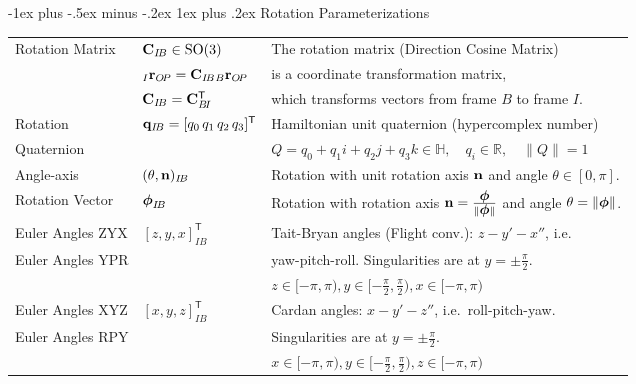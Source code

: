 \documentclass[10pt,landscape,a4paper]{article}
\makeatletter
\renewcommand{\subsubsection}{\@startsection{subsubsection}{3}{0mm}%
                                {-1ex plus -.5ex minus -.2ex}%
                                {1ex plus .2ex}%
                                {\normalfont\small\bfseries}}
\newcommand\norm[1]{\lVert #1 \rVert}
\newcommand\transpose{\mathsf{T}}
\newcommand\pos[3]{{}_#1\vr_{#2\!#3}}
\newcommand\comat[2]{\vC_{#1\!#2}}
\newcommand\quat[2]{\vq_{#1\!#2}}
\newcommand\angleaxis[2]{(\theta,\vn)_{#1\!#2}}
\newcommand\rotvec[2]{\vvph_{#1\!#2}}
\makeatother
\begin{document}
\begin{multicols}{2}
\subsubsection{Rotation Parameterizations}
\begin{tabular}{ll@{}l@{}}
\hline
Rotation Matrix& $\comat{I}{B} \in \mathrm{SO}(3)$ & The rotation matrix (Direction Cosine Matrix)  \\  
  & $ \pos{I}{O}{P} = \comat{I}{B} \pos{B}{O}{P}$ & is a coordinate transformation matrix,  \\
& $\comat{I}{B} = \comat{B}{I}^\transpose$ & which transforms vectors from frame $B$ to frame $I$. \\  \hline 
 Rotation  & $\quat{I}{B} = [ q_0 \, q_1  \, q_2  \,  q_3 ]^\transpose $ &  Hamiltonian unit quaternion (hypercomplex number)\\
Quaternion &   & $Q = q_0 + q_1 i + q_2 j + q_3 k \in \mathbb{H}, \quad q_i \in \mathbb{R}, \quad \norm{Q}= 1$ \\ \hline
Angle-axis & $\angleaxis{I}{B}$ &   Rotation with unit rotation axis $\mathbf n$ and angle $\theta \in [0, \pi]$. \\ \hline
Rotation Vector & $ \rotvec{I}{B} $  &  Rotation with rotation axis $\vn = \frac{\vvph}{\norm{\vvph}}$ and angle $\theta = \norm{\vvph}$. \\ \hline
Euler Angles ZYX &  $[z, y, x]^\transpose_{I\!B}$  & Tait-Bryan angles (Flight conv.): $z-y'-x''$, i.e.\   \\
Euler Angles YPR &  & yaw-pitch-roll. Singularities are at $y=\pm\frac{\pi}{2}$. \\
 &  & $z\in[-\pi,\pi), y\in[-\frac{\pi}{2},\frac{\pi}{2}), x\in[-\pi,\pi)$  \\  \hline
Euler Angles XYZ &  $[x, y, z]^\transpose_{I\!B}$ & Cardan angles: $x-y'-z''$, i.e.\ roll-pitch-yaw. \\
Euler Angles RPY & &  Singularities are at $y=\pm\frac{\pi}{2}$.  \\
 &  & $x\in[-\pi,\pi), y\in[-\frac{\pi}{2},\frac{\pi}{2}), z\in[-\pi,\pi)$  \\  \hline
\end{tabular} %


\end{multicols}
\end{document}
